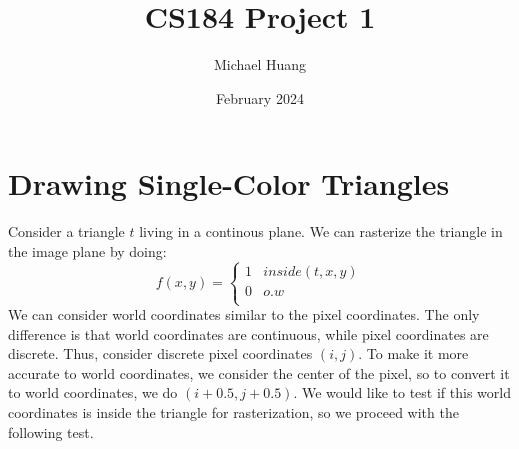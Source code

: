 \documentclass{article}
\title{CS184 Project 1}
\author{Michael Huang}
\date{February 2024}
\begin{document}
\maketitle

\section{Drawing Single-Color Triangles}
Consider a triangle $t$ living in a continous plane. We can rasterize the triangle in the image plane by doing:
$$f(x, y) = \begin{cases} 
      1 & inside(t, x, y) \\
      0 & o.w \\
   \end{cases}$$
We can consider world coordinates similar to the pixel coordinates. The only difference is that world coordinates are continuous, while pixel coordinates are discrete. Thus, consider discrete pixel coordinates $(i, j)$. To make it more accurate to world coordinates, we consider the center of the pixel, so to convert it to world coordinates, we do $(i + 0.5, j + 0.5)$. We would like to test if this world coordinates is inside the triangle for rasterization, so we proceed with the following test.
\end{document}
